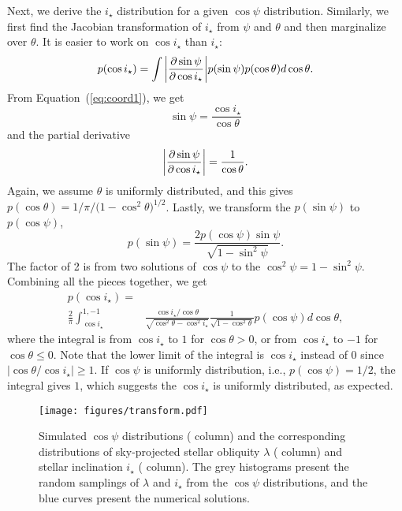 \documentclass[twocolumn,times,linenumbers]{aastex631}
\begin{document}
Next, we derive the $i_\star$ distribution for a given $\cos{\psi}$ distribution. Similarly, we first find the Jacobian transformation of $i_\star$ from $\psi$ and $\theta$ and then marginalize over $\theta$. It is easier to work on $\cos{i_\star}$ than $i_\star$:
\begin{equation}
    p(\cos{i_\star}) = \int \abs{\pdv{\sin{\psi}}{\cos{i_\star}}} p(\sin{\psi}) p(\cos{\theta}) d\cos{\theta}.
\end{equation}
From Equation~(\ref{eq:coord1}), we get 
\begin{equation}
    \sin{\psi} = \frac{\cos{i_\star}}{\cos{\theta}}
\end{equation} and the partial derivative
\begin{equation}
    \abs{\pdv{\sin{\psi}}{\cos{i_\star}}} = \frac{1}{\cos{\theta}}.
\end{equation} 
Again, we assume $\theta$ is uniformly distributed, and this gives $p(\cos{\theta}) = 1/\pi/(1-\cos^2{\theta)^{1/2}}$. Lastly, we transform the $p(\sin{\psi})$ to $p(\cos{\psi})$,
\begin{equation}
    p(\sin{\psi}) = \frac{2p(\cos{\psi})\sin{\psi}}{\sqrt{1-\sin^2{\psi}}}.
\end{equation}
The factor of 2 is from two solutions of $\cos{\psi}$ to the $\cos^2{\psi} = 1-\sin^2{\psi}$. Combining all the pieces together, we get
\begin{align}\label{eqn:jac_istar}
    p(\cos{i_\star}) = \nonumber\\ 
    \frac{2}{\pi} \int_{\cos{i_\star}}^{1,-1}& \frac{\cos{i_\star}/\cos{\theta}}{\sqrt{\cos^2{\theta}-\cos^2{i_\star}}}
    \frac{1}{\sqrt{1-\cos^2{\theta}}} p(\cos{\psi}) d\cos{\theta},
\end{align}
where the integral is from $\cos{i_\star}$ to $1$ for $\cos{\theta} > 0$, or from $\cos{i_\star}$ to $-1$ for $\cos{\theta} \leqslant 0$.
Note that the lower limit of the integral is $\cos{i_\star}$ instead of 0 since $\lvert \cos{\theta}/\cos{i_\star} \rvert \geqslant 1$.
If $\cos{\psi}$ is uniformly distribution, i.e., $p(\cos{\psi}) = 1/2$, the integral gives $1$, which suggests the $\cos{i_\star}$ is uniformly distributed, as expected.

\begin{figure*}[ht!]
    \centering
    \texttt{[image: figures/transform.pdf]}
    \caption{Simulated $\cos{\psi}$ distributions ( column) and the corresponding distributions of sky-projected stellar obliquity $\lambda$ ( column) and stellar inclination $i_\star$ ( column). The grey histograms present the random samplings of $\lambda$ and $i_\star$ from the $\cos{\psi}$ distributions, and the blue curves present the numerical solutions.}
    \label{fig:transform}
\end{figure*}
\end{document}
